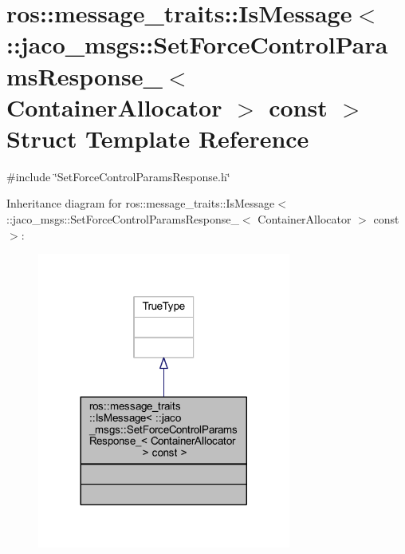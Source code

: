 \hypertarget{structros_1_1message__traits_1_1IsMessage_3_01_1_1jaco__msgs_1_1SetForceControlParamsResponse___7f6f76d7d541d1511bf9768100124dcb}{}\section{ros\+:\+:message\+\_\+traits\+:\+:Is\+Message$<$ \+:\+:jaco\+\_\+msgs\+:\+:Set\+Force\+Control\+Params\+Response\+\_\+$<$ Container\+Allocator $>$ const $>$ Struct Template Reference}
\label{structros_1_1message__traits_1_1IsMessage_3_01_1_1jaco__msgs_1_1SetForceControlParamsResponse___7f6f76d7d541d1511bf9768100124dcb}


{\ttfamily \#include \char`\"{}Set\+Force\+Control\+Params\+Response.\+h\char`\"{}}



Inheritance diagram for ros\+:\+:message\+\_\+traits\+:\+:Is\+Message$<$ \+:\+:jaco\+\_\+msgs\+:\+:Set\+Force\+Control\+Params\+Response\+\_\+$<$ Container\+Allocator $>$ const $>$\+:
\nopagebreak
\begin{figure}[H]
\begin{center}
\leavevmode
\includegraphics[width=236pt]{d2/da4/structros_1_1message__traits_1_1IsMessage_3_01_1_1jaco__msgs_1_1SetForceControlParamsResponse___62d5ed5a0089942e0a705b6e743c4fff}
\end{center}
\end{figure}


